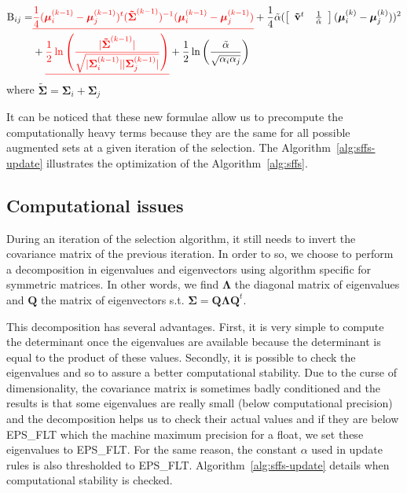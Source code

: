 \documentclass[a4paper,11pt,DIV=16,abstracton]{scrartcl}
\newcommand*{\equl}[2]{%
    \textcolor{#1}{\underline{#2}}%
}
\begin{document}
        \begin{align*}
            \text{B}_{ij} = &\equl{red}{\frac{1}{4} (\boldsymbol{\mu}_i^{(k-1)} - \boldsymbol{\mu}_j^{(k-1)})^t ( \boldsymbol{\tilde{\Sigma}}^{(k-1)} )^{-1} (\boldsymbol{\mu}_i^{(k-1)} - \boldsymbol{\mu}_j^{(k-1)})} + \frac{1}{4} \tilde{\alpha} ( \left[\begin{array}{cc} \mathbf{\tilde{v}}^t & \frac{1}{\tilde{\alpha}} \end{array}\right] (\boldsymbol{\mu}_{i}^{(k)} - \boldsymbol{\mu}_{j}^{(k)}) )^2\\
            &+ \equl{red}{\frac{1}{2} \ln \left( \frac{|\boldsymbol{\tilde{\Sigma}}^{(k-1)}|}{\sqrt{|\boldsymbol{\Sigma}_i^{(k-1)}| |\boldsymbol{\Sigma}_j^{(k-1)}|}} \right)} + \frac{1}{2} \ln \left( \frac{\tilde{\alpha}}{\sqrt{\alpha_i \alpha_j}} \right)
        \end{align*}
        where $\boldsymbol{\tilde{\Sigma}} = \boldsymbol{\Sigma}_i + \boldsymbol{\Sigma}_j$

        It can be noticed that these new formulae allow us to precompute the computationally heavy terms because they are the same for all possible augmented sets at a given iteration of the selection. The Algorithm~\ref{alg:sffs-update} illustrates the optimization of the Algorithm~\ref{alg:sffs}.

        \subsection{Computational issues}

        During an iteration of the selection algorithm, it still needs to invert the covariance matrix of the previous iteration. In order to so, we choose to perform a decomposition in eigenvalues and eigenvectors using algorithm specific for symmetric matrices. In other words, we find $\boldsymbol{\Lambda}$ the diagonal matrix of eigenvalues and $\mathbf{Q}$ the matrix of eigenvectors s.t. $\boldsymbol{\Sigma} = \mathbf{Q} \boldsymbol{\Lambda} \mathbf{Q}^t$.

        This decomposition has several advantages. First, it is very simple to compute the determinant once the eigenvalues are available because the determinant is equal to the product of these values. Secondly, it is possible to check the eigenvalues and so to assure a better computational stability. Due to the curse of dimensionality, the covariance matrix is sometimes badly conditioned and the results is that some eigenvalues are really small (below computational precision) and the decomposition helps us to check their actual values and if they are below EPS\_FLT which the machine maximum precision for a float, we set these eigenvalues to EPS\_FLT. For the same reason, the constant $\alpha$ used in update rules is also thresholded to EPS\_FLT. Algorithm~\ref{alg:sffs-update} details when computational stability is checked.
\end{document}
